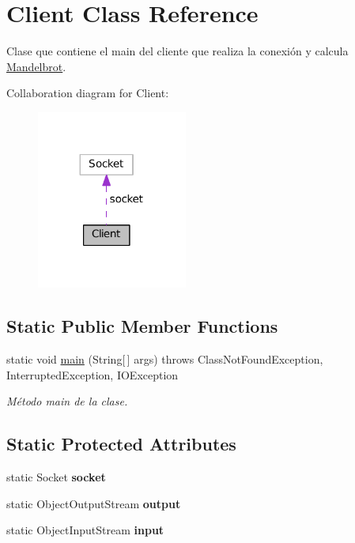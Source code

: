 \hypertarget{class_client}{}\section{Client Class Reference}
\label{class_client}


Clase que contiene el main del cliente que realiza la conexión y calcula \hyperlink{class_mandelbrot}{Mandelbrot}.  




Collaboration diagram for Client\+:
\nopagebreak
\begin{figure}[H]
\begin{center}
\leavevmode
\includegraphics[width=140pt]{class_client__coll__graph}
\end{center}
\end{figure}
\subsection*{Static Public Member Functions}
\begin{DoxyCompactItemize}
\item 
static void \hyperlink{class_client_ab9b892ebe4b84667bfe6da7181385481}{main} (String\mbox{[}$\,$\mbox{]} args)  throws Class\+Not\+Found\+Exception, Interrupted\+Exception, I\+O\+Exception 
\begin{DoxyCompactList}\small\item\em Método main de la clase. \end{DoxyCompactList}\end{DoxyCompactItemize}
\subsection*{Static Protected Attributes}
\begin{DoxyCompactItemize}
\item 
\hypertarget{class_client_a8e8a6328d58ae78542f29ae058f2b909}{}static Socket {\bfseries socket}\label{class_client_a8e8a6328d58ae78542f29ae058f2b909}

\item 
\hypertarget{class_client_a6c6fb14b922f88c0ce93e9ee8b16478b}{}static Object\+Output\+Stream {\bfseries output}\label{class_client_a6c6fb14b922f88c0ce93e9ee8b16478b}

\item 
\hypertarget{class_client_a54dd9ac6c9b61f4c74977c17b20df71d}{}static Object\+Input\+Stream {\bfseries input}\label{class_client_a54dd9ac6c9b61f4c74977c17b20df71d}

\end{DoxyCompactItemize}


